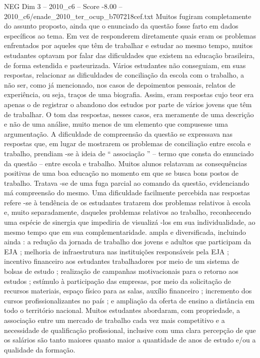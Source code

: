 \begin{textsample}{NEG Dim 3 – 2010\_c6 – Score -8.00 – 2010\_c6/enade\_2010\_ter\_ocup\_b707218cef.txt}
Muitos fugiram completamente do assunto proposto, ainda que o enunciado da questão fosse farto em dados específicos ao tema.
Em vez de responderem diretamente quais eram os problemas enfrentados por aqueles que têm de trabalhar e estudar ao mesmo tempo, muitos estudantes optavam por falar das dificuldades que existem na educação brasileira, de forma estendida e pasteurizada.
Vários estudantes não conseguiam, em suas respostas, relacionar as dificuldades de conciliação da escola com o trabalho, a não ser, como já mencionado, nos casos de depoimentos pessoais, relatos de experiência, ou seja, traços de uma biografia.
Assim, eram respostas cujo teor era apenas o de registrar o abandono dos estudos por parte de vários jovens que têm de trabalhar.
O tom das respostas, nesses casos, era meramente de uma descrição e não de uma análise, muito menos de um elemento que compusesse uma argumentação.
A dificuldade de compreensão da questão se expressava nas respostas que, em lugar de mostrarem os problemas de conciliação entre escola e trabalho, prendiam -se à ideia de “ associação ” – termo que consta do enunciado da questão – entre escola e trabalho.
Muitos alunos relatavam as consequências positivas de uma boa educação no momento em que se busca bons postos de trabalho.
Tratava -se de uma fuga parcial ao comando da questão, evidenciando má compreensão do mesmo.
Uma dificuldade facilmente percebida nas respostas refere -se à tendência de os estudantes tratarem dos problemas relativos à escola e, muito separadamente, daqueles problemas relativos ao trabalho, reconhecendo uma espécie de sinergia que impediria de visualizá -los em sua individualidade, ao mesmo tempo que em sua complementaridade. ampla e diversificada, incluindo ainda : a redução da jornada de trabalho dos jovens e adultos que participam da EJA ; melhoria de infraestrutura nas instituições responsáveis pela EJA ; incentivo financeiro aos estudantes trabalhadores por meio de um sistema de bolsas de estudo ; realização de campanhas motivacionais para o retorno aos estudos ; estímulo à participação das empresas, por meio da solicitação de recursos materiais, espaço físico para as salas, auxílio financeiro ; incremento dos cursos profissionalizantes no país ; e ampliação da oferta de ensino a distância em todo o território nacional.
Muitos estudantes abordaram, com propriedade, a associação entre um mercado de trabalho cada vez mais competitivo e a necessidade de qualificação profissional, inclusive com uma clara percepção de que os salários são tanto maiores quanto maior a quantidade de anos de estudo e/ou a qualidade da formação.

\end{textsample}
